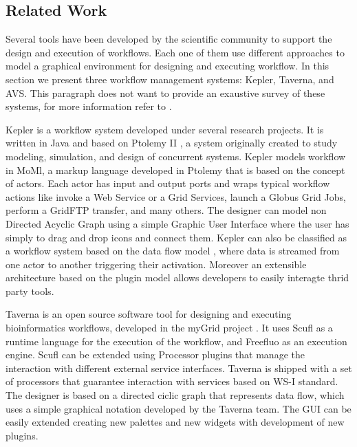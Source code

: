 \documentclass[conference]{IEEEtran}
\begin{document}
\subsection {Related Work}




Several tools have been developed by the scientific community to support
the design and execution of workflows. Each one of them use different
approaches to model a graphical environment for designing and executing
workflow. In this section we present three workflow management systems:
Kepler, Taverna, and AVS. This paragraph does not want to provide an
exaustive survey of these systems, for more information refer to
\cite{wf-grid}.

Kepler is a workflow system developed under several research projects. It
is written in Java and based on Ptolemy II \cite{ptolemy}, a system
originally created to study modeling, simulation, and design of concurrent
systems. Kepler models workflow in MoMl, a markup language developed in
Ptolemy that is based on the concept of actors. Each actor has input and
output ports and wraps typical workflow actions like invoke a Web Service
or a Grid Services, launch a Globus Grid Jobs, perform a GridFTP transfer,
and many others. The designer can model non Directed Acyclic Graph using a
simple Graphic User Interface where the user has simply to drag and drop
icons and connect them. Kepler can also be classified as a workflow system
based on the data flow model \cite{kepler}, where data is streamed from one
actor to another triggering their activation. Moreover an extensible
architecture based on the plugin model allows developers to easily
interagte thrid party tools.

Taverna is an open source software tool for designing and executing
bioinformatics workflows, developed in the myGrid project \cite{taverna}.
It uses Scufl as a runtime language for the execution of the workflow, and
Freefluo as an execution engine. Scufl can be extended using Processor
plugins that manage the interaction with different external service
interfaces. Taverna is shipped with a set of processors that guarantee
interaction with services based on WS-I standard. The designer is based on
a directed ciclic graph that represents data flow, which uses a simple
graphical notation developed by the Taverna team. The GUI can be easily
extended creating new palettes and new widgets with development of new
plugins.
\end{document}
